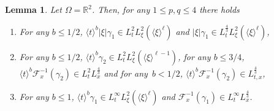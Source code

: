 \documentclass[11pt]{article}
\newtheorem{lemm}[theo]{Lemma}
\theoremstyle{definition}
\numberwithin{equation}{section}
\numberwithin{figure}{section}
\numberwithin{table}{section}
\newcommand*\R {\mathbb{R}}
\newcommand*{\romanenumi}{\renewcommand*{\theenumi}{\roman{enumi}}}
\begin{document}
\begin{lemm}\label{lem:gamma&tildegammaR2}
Let $\Omega = \R^2$. Then, for any $1 \le p, q \le 4$ there holds
\begin{enumerate}\romanenumi
\item \label{listlemmB9.1}For any $b \le 1/2$, $\langle t \rangle^b |\xi| \gamma_1 \in L^2_tL^2_\xi(\langle \xi \rangle^\ell) $ and $ |\xi| \gamma_1 \in L^{\frac43}_tL^2_\xi(\langle \xi \rangle^\ell)$,
\item \label{listlemmB9.2}For any $b\le 1/2$, $\langle t \rangle^b \gamma_2 \in L^2_t L^2_\xi(\langle \xi \rangle^{\ell-1}) $, for any $b \le 3/4$, $\langle t \rangle^b \mathcal{F}_x^{-1}(\gamma_2) \in L^2_t L^{\frac43}_x$ and for any~$b<1/2$, $\langle t \rangle^b \mathcal{F}_x^{-1}(\gamma_2) \in L^{\frac43}_{t,x}$,
\item \label{listlemmB9.3}For any $b \le 1$, $\langle t \rangle^b \gamma_1 \in L^\infty_tL^2_\xi(\langle \xi \rangle^\ell)$ and $ \mathcal{F}_x^{-1}(\gamma_1) \in L^\infty_t L^{\frac43}_x$.
\end{enumerate}

\end{lemm}
\end{document}
